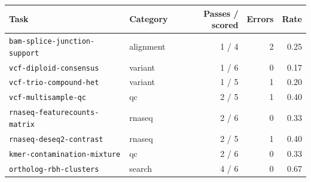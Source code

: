 \begin{tabular}{llrrr}
\toprule
Task & Category & Passes / scored & Errors & Rate \\
\midrule
\texttt{bam-splice-junction-support} & alignment & 1 / 4 & 2 & 0.25 \\
\texttt{vcf-diploid-consensus} & variant & 1 / 6 & 0 & 0.17 \\
\texttt{vcf-trio-compound-het} & variant & 1 / 5 & 1 & 0.20 \\
\texttt{vcf-multisample-qc} & qc & 2 / 5 & 1 & 0.40 \\
\texttt{rnaseq-featurecounts-matrix} & rnaseq & 2 / 6 & 0 & 0.33 \\
\texttt{rnaseq-deseq2-contrast} & rnaseq & 2 / 5 & 1 & 0.40 \\
\texttt{kmer-contamination-mixture} & qc & 2 / 6 & 0 & 0.33 \\
\texttt{ortholog-rbh-clusters} & search & 4 / 6 & 0 & 0.67 \\
\bottomrule
\end{tabular}
